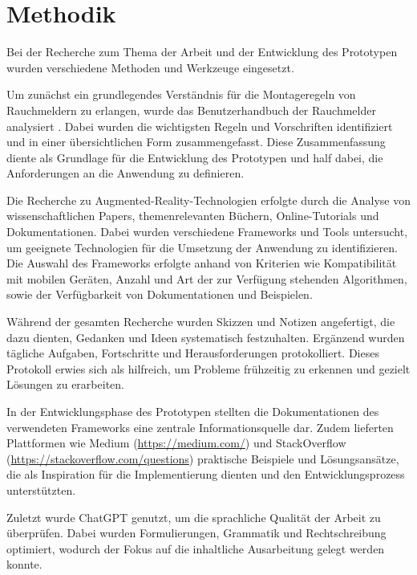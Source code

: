 \chapter{Methodik}

Bei der Recherche zum Thema der Arbeit und der Entwicklung des Prototypen wurden verschiedene Methoden und Werkzeuge eingesetzt.

Um zunächst ein grundlegendes Verständnis für die Montageregeln von Rauchmeldern zu erlangen, wurde das Benutzerhandbuch der Rauchmelder analysiert \cite{brunata2023handbuch}. Dabei wurden die wichtigsten Regeln und Vorschriften identifiziert und in einer übersichtlichen Form zusammengefasst. Diese Zusammenfassung diente als Grundlage für die Entwicklung des Prototypen und half dabei, die Anforderungen an die Anwendung zu definieren.

Die Recherche zu Augmented-Reality-Technologien erfolgte durch die Analyse von wissenschaftlichen Papers, themenrelevanten Büchern, Online-Tutorials und Dokumentationen. Dabei wurden verschiedene Frameworks und Tools untersucht, um geeignete Technologien für die Umsetzung der Anwendung zu identifizieren. Die Auswahl des Frameworks erfolgte anhand von Kriterien wie Kompatibilität mit mobilen Geräten, Anzahl und Art der zur Verfügung stehenden Algorithmen, sowie der Verfügbarkeit von Dokumentationen und Beispielen.

Während der gesamten Recherche wurden Skizzen und Notizen angefertigt, die dazu dienten, Gedanken und Ideen systematisch festzuhalten. Ergänzend wurden tägliche Aufgaben, Fortschritte und Herausforderungen protokolliert. Dieses Protokoll erwies sich als hilfreich, um Probleme frühzeitig zu erkennen und gezielt Lösungen zu erarbeiten.

In der Entwicklungsphase des Prototypen stellten die Dokumentationen des verwendeten Frameworks eine zentrale Informationsquelle dar. Zudem lieferten Plattformen wie Medium (\url{https://medium.com/}) und StackOverflow (\url{https://stackoverflow.com/questions}) praktische Beispiele und Lösungsansätze, die als Inspiration für die Implementierung dienten und den Entwicklungsprozess unterstützten.

Zuletzt wurde ChatGPT genutzt, um die sprachliche Qualität der Arbeit zu überprüfen. Dabei wurden Formulierungen, Grammatik und Rechtschreibung optimiert, wodurch der Fokus auf die inhaltliche Ausarbeitung gelegt werden konnte.
